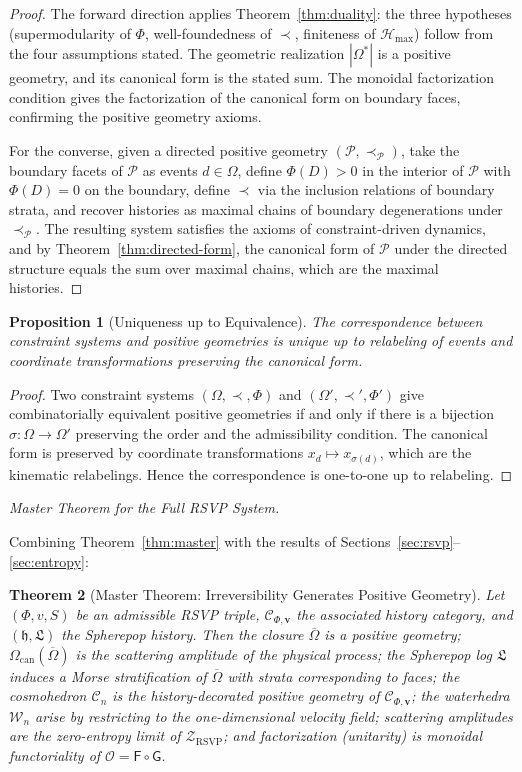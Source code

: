 \documentclass[11pt]{article}
\theoremstyle{plain}
\newtheorem{theorem}{Theorem}[section]
\newtheorem{proposition}[theorem]{Proposition}
\theoremstyle{definition}
\theoremstyle{remark}
\newcommand{\Phif}{\Phi}
\newcommand{\vf}{v}
\newcommand{\Sf}{S}
\newcommand{\OmKS}{\Omega}
\newcommand{\hist}{\mathfrak{h}}
\newcommand{\Log}{\mathfrak{L}}
\newcommand{\Cosmo}{\mathcal{C}_n}
\newcommand{\Water}{\mathcal{W}_n}
\newcommand{\CF}{\Omega_{\mathrm{can}}}
\newcommand{\Ccat}{\mathcal{C}_{\Phi,\mathbf{v}}}
\newcommand{\Gfun}{\mathsf{G}}
\newcommand{\Ffun}{\mathsf{F}}
\newcommand{\Ofun}{\mathcal{O}}
\newcommand{\ZRSVP}{\mathcal{Z}_{\mathrm{RSVP}}}
\newcommand{\Hmax}{\mathcal{H}_{\max}}
\begin{document}
\begin{proof}
The forward direction applies Theorem~\ref{thm:duality}: the three hypotheses (supermodularity of $\Phif$, well-foundedness of $\prec$, finiteness of $\Hmax$) follow from the four assumptions stated. The geometric realization $|\OmKS^*|$ is a positive geometry, and its canonical form is the stated sum. The monoidal factorization condition gives the factorization of the canonical form on boundary faces, confirming the positive geometry axioms.

For the converse, given a directed positive geometry $(\mathcal{P}, \prec_{\mathcal{P}})$, take the boundary facets of $\mathcal{P}$ as events $d \in \OmKS$, define $\Phif(D) > 0$ in the interior of $\mathcal{P}$ with $\Phif(D) = 0$ on the boundary, define $\prec$ via the inclusion relations of boundary strata, and recover histories as maximal chains of boundary degenerations under $\prec_{\mathcal{P}}$. The resulting system satisfies the axioms of constraint-driven dynamics, and by Theorem~\ref{thm:directed-form}, the canonical form of $\mathcal{P}$ under the directed structure equals the sum over maximal chains, which are the maximal histories.
\end{proof}

\begin{proposition}[Uniqueness up to Equivalence]
The correspondence between constraint systems and positive geometries is unique up to relabeling of events and coordinate transformations preserving the canonical form.
\end{proposition}

\begin{proof}
Two constraint systems $(\OmKS, \prec, \Phif)$ and $(\OmKS', \prec', \Phif')$ give combinatorially equivalent positive geometries if and only if there is a bijection $\sigma: \OmKS \to \OmKS'$ preserving the order and the admissibility condition. The canonical form is preserved by coordinate transformations $x_d \mapsto x_{\sigma(d)}$, which are the kinematic relabelings. Hence the correspondence is one-to-one up to relabeling.
\end{proof}

\medskip\noindent\textit{Master Theorem for the Full RSVP System.}

Combining Theorem~\ref{thm:master} with the results of Sections~\ref{sec:rsvp}--\ref{sec:entropy}:

\begin{theorem}[Master Theorem: Irreversibility Generates Positive Geometry]
Let $(\Phif, \vf, \Sf)$ be an admissible RSVP triple, $\Ccat$ the associated history category, and $(\hist, \Log)$ the Spherepop history. Then the closure $\overline{\OmKS}$ is a positive geometry; $\CF(\overline{\OmKS})$ is the scattering amplitude of the physical process; the Spherepop log $\Log$ induces a Morse stratification of $\overline{\OmKS}$ with strata corresponding to faces; the cosmohedron $\Cosmo$ is the history-decorated positive geometry of $\Ccat$; the waterhedra $\Water$ arise by restricting to the one-dimensional velocity field; scattering amplitudes are the zero-entropy limit of $\ZRSVP$; and factorization (unitarity) is monoidal functoriality of $\Ofun = \Ffun \circ \Gfun$.
\end{theorem}
\end{document}
